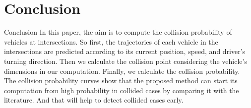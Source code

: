 \documentclass{beamer}
\begin{document}
\section{Conclusion}
\begin{frame}{Conclusion}
    In this paper, the aim is to compute the collision probability of vehicles at intersections. So first, the trajectories of each vehicle  in  the  intersections  are  predicted  according  to  its current  position,  speed,  and  driver’s turning direction. Then we calculate the collision point considering the vehicle’s dimensions in our computation. Finally, we calculate the collision  probability. The collision probability curves show that  the  proposed method can start its computation from high probability in collided cases by comparing it with the literature. And that will help to detect collided cases early.
\end{frame}
\end{document}
